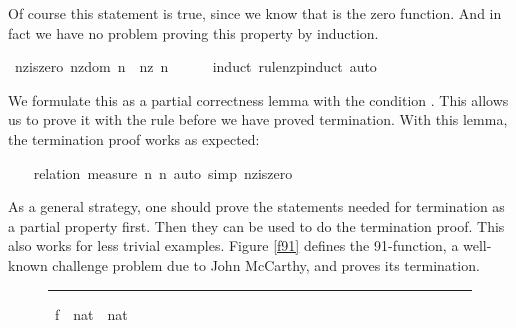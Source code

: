 \begin{isabellebody}
\begin{isamarkuptxt}
  Of course this statement is true, since we know that  is
  the zero function. And in fact we have no problem proving this
  property by induction.%
\end{isamarkuptxt}%
\isamarkuptrue%
%
\endisatagproof
{\isafoldproof}%
%
\isadelimproof
%
\endisadelimproof
{}\isamarkupfalse%
\ nz{\isacharunderscore}is{\isacharunderscore}zero{\isacharcolon}\ {\isachardoublequoteopen}nz{\isacharunderscore}dom\ n\ {\isasymLongrightarrow}\ nz\ n\ {\isacharequal}\ {}{\isachardoublequoteclose}\isanewline
%
\isadelimproof
\ \ %
\endisadelimproof
%
\isatagproof
{}\isamarkupfalse%
\ {\isacharparenleft}induct\ rule{\isacharcolon}nz{\isachardot}pinduct{\isacharparenright}\ auto%
\endisatagproof
{\isafoldproof}%
%
\isadelimproof
%
\endisadelimproof
%
\begin{isamarkuptext}%
We formulate this as a partial correctness lemma with the condition
  . This allows us to prove it with the  rule before we have proved termination. With this lemma,
  the termination proof works as expected:%
\end{isamarkuptext}%
\isamarkuptrue%
\isamarkupfalse%
\isanewline
%
\isadelimproof
\ \ %
\endisadelimproof
%
\isatagproof
{}\isamarkupfalse%
\ {\isacharparenleft}relation\ {\isachardoublequoteopen}measure\ {\isacharparenleft}{\isasymlambda}n{\isachardot}\ n{\isacharparenright}{\isachardoublequoteclose}{\isacharparenright}\ {\isacharparenleft}auto\ simp{\isacharcolon}\ nz{\isacharunderscore}is{\isacharunderscore}zero{\isacharparenright}%
\endisatagproof
{\isafoldproof}%
%
\isadelimproof
%
\endisadelimproof
%
\begin{isamarkuptext}%
As a general strategy, one should prove the statements needed for
  termination as a partial property first. Then they can be used to do
  the termination proof. This also works for less trivial
  examples. Figure \ref{f91} defines the 91-function, a well-known
  challenge problem due to John McCarthy, and proves its termination.%
\end{isamarkuptext}%
\isamarkuptrue%
%
\begin{figure}
\hrule\vspace{6pt}
\begin{minipage}{0.8\textwidth}
\isastyle\isamarkuptrue
{}\isamarkupfalse%
\ f{}{}\ {\isacharcolon}{\isacharcolon}\ {\isachardoublequoteopen}nat\ {\isasymRightarrow}\ nat{\isachardoublequoteclose}\isanewline

\end{minipage}
\end{figure}
\end{isabellebody}
